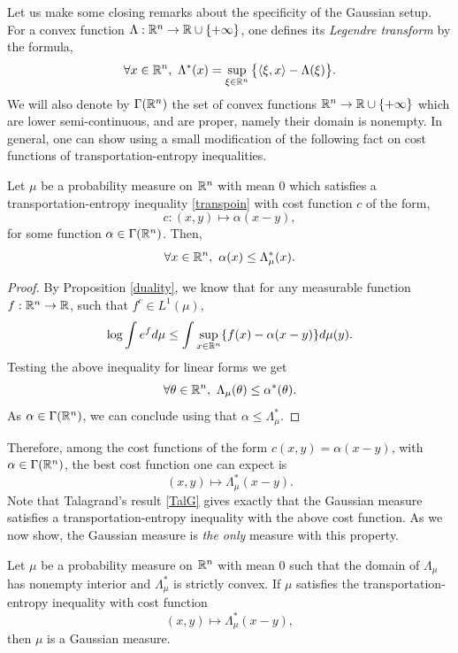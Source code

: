 \documentclass[a4paper,oneside,11pt]{article}
\begin{document}
Let us make some closing remarks about the specificity of the Gaussian setup. 
For a convex function $\Lambda : \mathbb{R}^n \to \mathbb{R} \cup\{+\infty\}$, one defines its \textit{Legendre transform} by the formula,
$$ \forall x \in \mathbb{R}^n, \ \Lambda^*(x) = \sup_{\xi \in \mathbb{R}^n} \big\{ \langle \xi,x\rangle - \Lambda(\xi) \big\}.$$
We will also denote by $\Gamma(\mathbb{R}^n)$ the set of convex functions $\mathbb{R}^n \to \mathbb{R}\cup\{+\infty\}$ which are lower semi-continuous, and are proper, namely their domain is nonempty.
 In general, one can show using a small modification of \cite[Remark 2.12]{LW} the following fact on cost functions of transportation-entropy inequalities.

\begin{Fact} Let $\mu$ be a probability measure on $\mathbb{R}^n$ with mean $0$ which  satisfies a transportation-entropy inequality \eqref{transpoin} with cost function $c$ of the form,
$$ c : (x,y) \mapsto \alpha(x-y),$$
for some function $\alpha \in \Gamma(\mathbb{R}^n)$. Then,
$$\forall x \in \mathbb{R}^n, \  \alpha(x) \leq \Lambda^*_\mu(x).$$ 
\end{Fact}
\begin{proof}
By Proposition \ref{duality}, we know that for any measurable function $f : \mathbb{R}^n \to \mathbb{R}$, such that $f^c \in L^1(\mu)$,
$$ \log \int e^{f}d\mu \leq \int \sup_{x \in \mathbb{R}^n} \{ f(x)-\alpha(x-y) \}  d\mu(y).$$ 
Testing the above inequality for linear forms we get
$$\forall \theta \in \mathbb{R}^n, \  \Lambda_\mu(\theta) \leq \alpha^*(\theta). $$
As $\alpha \in \Gamma(\mathbb{R}^n)$, we can conclude using \cite[ Theorem 4.21]{Clarke} that $\alpha \leq \Lambda^*_\mu$.
 
\end{proof}

Therefore, among the cost functions of the form $c(x,y) =\alpha(x-y)$, with $\alpha \in \Gamma(\mathbb{R}^n)$, the best cost function one can expect is
$$ (x,y) \mapsto \Lambda^*_\mu(x-y).$$
 Note that Talagrand's result \eqref{TalG} gives exactly that the Gaussian measure satisfies a transportation-entropy inequality with the above cost function.
As we now show,  the Gaussian measure is \textit{the only} measure with this property.

\begin{Fact}
Let $\mu$ be a probability measure on $\mathbb{R}^n$ with mean $0$ such that the domain of $\Lambda_\mu$ has nonempty interior and $\Lambda_\mu^*$ is strictly convex. If $\mu$ satisfies the transportation-entropy inequality with cost function
$$ (x,y) \mapsto \Lambda_\mu^*(x-y),$$
then $\mu$ is a Gaussian measure.
\end{Fact}
\end{document}
